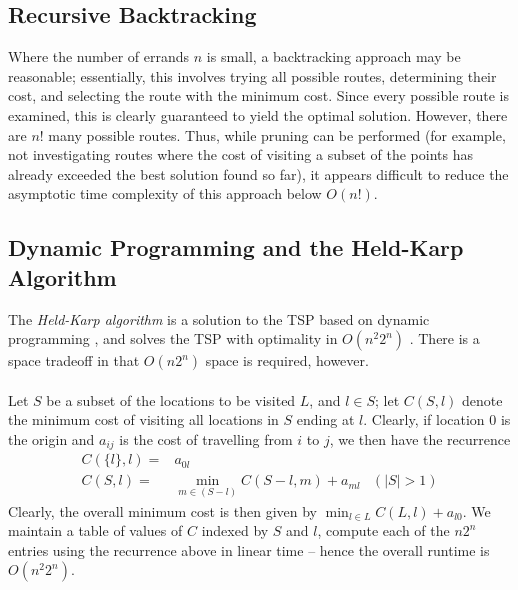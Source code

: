 \documentclass[a4paper, 10pt]{report}
\begin{document}
\subsection{Recursive Backtracking}
Where the number of errands $n$ is small, a backtracking approach may be reasonable; essentially, this involves trying all possible routes, determining their cost, and selecting the route with the minimum cost. Since every possible route is examined, this is clearly guaranteed to yield the optimal solution. However, there are $n!$ many possible routes. Thus, while pruning can be performed (for example, not investigating routes where the cost of visiting a subset of the points has already exceeded the best solution found so far), it appears difficult to reduce the asymptotic time complexity of this approach below $O(n!)$.
\subsection{Dynamic Programming and the Held-Karp Algorithm}
The \textit{Held-Karp algorithm} is a solution to the TSP based on dynamic programming \cite{dp}, and solves the TSP with optimality in $O(n^2 2^n)$ \cite{heldkarp}. There is a space tradeoff in that $O(n 2^n)$ space is required, however. \\\\
Let $S$ be a subset of the locations to be visited $L$, and $l \in S$; let $C(S, l)$ denote the minimum cost of visiting all locations in $S$ ending at $l$. Clearly, if location $0$ is the origin and $a_{ij}$ is the cost of travelling from $i$ to $j$, we then have the recurrence
\begin{align*}
C(\lbrace l \rbrace, l) = & a_{0l} \\
C(S, l) = & \min_{m \in (S - l)} C(S - l, m) + a_{ml} & (|S| > 1)
\end{align*}
Clearly, the overall minimum cost is then given by $\min_{l \in L} C(L, l) + a_{l0}$. We maintain a table of values of $C$ indexed by $S$ and $l$, compute each of the $n2^n$ entries using the recurrence above in linear time -- hence the overall runtime is $O(n^2 2^n)$. \cite{heldkarp}
\end{document}
